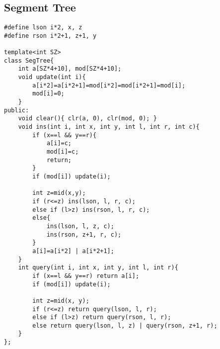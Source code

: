 \subsection{Segment Tree}
\begin{lstlisting}
#define lson i*2, x, z
#define rson i*2+1, z+1, y

template<int SZ>
class SegTree{
	int a[SZ*4+10], mod[SZ*4+10];
	void update(int i){
		a[i*2]=a[i*2+1]=mod[i*2]=mod[i*2+1]=mod[i];
		mod[i]=0;
	}
public:
	void clear(){ clr(a, 0), clr(mod, 0); }
	void ins(int i, int x, int y, int l, int r, int c){
		if (x==l && y==r){
			a[i]=c;
			mod[i]=c;
			return;
		}
		if (mod[i]) update(i);

		int z=mid(x,y);
		if (r<=z) ins(lson, l, r, c);
		else if (l>z) ins(rson, l, r, c);
		else{
			ins(lson, l, z, c);
			ins(rson, z+1, r, c);
		}
		a[i]=a[i*2] | a[i*2+1];
	}
	int query(int i, int x, int y, int l, int r){
		if (x==l && y==r) return a[i];
		if (mod[i]) update(i);

		int z=mid(x, y);
		if (r<=z) return query(lson, l, r);
		else if (l>z) return query(rson, l, r);
		else return query(lson, l, z) | query(rson, z+1, r);
	}
};
\end{lstlisting}
